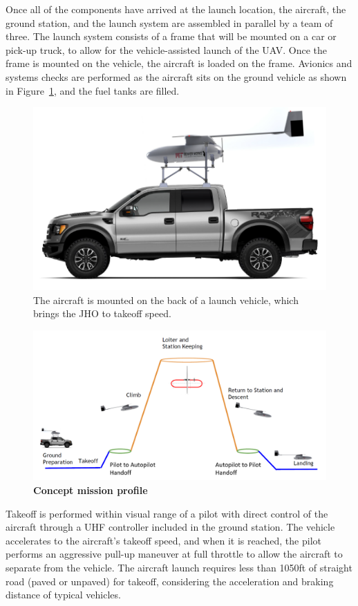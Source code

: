 \documentclass[journal]{aiaa-tc}%
\begin{document}
Once all of the components have arrived at the launch location, the aircraft, the ground station, and the launch system are assembled in parallel by a team of three. The launch system consists of a frame that will be mounted on a car or pick-up truck, to allow for the vehicle-assisted launch of the UAV. Once the frame is mounted on the vehicle, the aircraft is loaded on the frame. Avionics and systems checks are performed as the aircraft sits on the ground vehicle as shown in Figure~\ref{f:takeoffVehicle}, and the fuel tanks are filled. 

\begin{figure}
	\centering
	\includegraphics[width = .5\textwidth]{takeoffVehicle.png}
	\caption{The aircraft is mounted on the back of a launch vehicle, which brings the JHO to takeoff speed.}
	\label{f:takeoffVehicle}
\end{figure}

\begin{figure}[h!]
    \begin{center}
    \includegraphics[width = .75\textwidth]{missionProfileLabeled.png}
     \caption{ \textbf{Concept mission profile} }
    \label{f:missionProfile}
    \end{center}
\end{figure}

 Takeoff is performed within visual range of a pilot with direct control of the aircraft through a UHF controller included in the ground station. The vehicle accelerates to the aircraft's takeoff speed, and when it is reached, the pilot performs an aggressive pull-up maneuver at full throttle to allow the aircraft to separate from the vehicle. The aircraft launch requires less than 1050ft of straight road (paved or unpaved) for takeoff, considering the acceleration and braking distance of typical vehicles.
\end{document}
